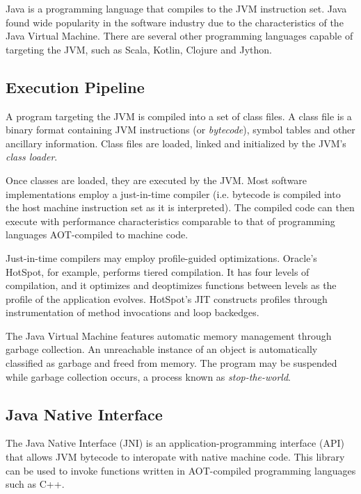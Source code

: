 Java is a programming language that compiles to the JVM instruction set. Java found wide popularity in the software industry due to the characteristics of the Java Virtual Machine. There are several other programming languages capable of targeting the JVM, such as Scala, Kotlin, Clojure and Jython.

\subsection{Execution Pipeline}

A program targeting the JVM is compiled into a set of class files. A class file is a binary format containing JVM instructions (or \emph{bytecode}), symbol tables and other ancillary information. Class files are loaded, linked and initialized by the JVM's \emph{class loader}.

Once classes are loaded, they are executed by the JVM. Most software implementations employ a just-in-time compiler (i.e. bytecode is compiled into the host machine instruction set as it is interpreted). The compiled code can then execute with performance characteristics comparable to that of programming languages AOT-compiled to machine code.

Just-in-time compilers may employ profile-guided optimizations. Oracle's HotSpot, for example, performs tiered compilation. It has four levels of compilation, and it optimizes and deoptimizes functions between levels as the profile of the application evolves. HotSpot's JIT constructs profiles through instrumentation of method invocations and loop backedges.

The Java Virtual Machine features automatic memory management through garbage collection. An unreachable instance of an object is automatically classified as garbage and freed from memory. The program may be suspended while garbage collection occurs, a process known as \emph{stop-the-world}.



\subsection{Java Native Interface}

The Java Native Interface (JNI) is an application-programming interface (API) that allows JVM bytecode to interopate with native machine code. This library can be used to invoke functions written in AOT-compiled programming languages such as C++.

